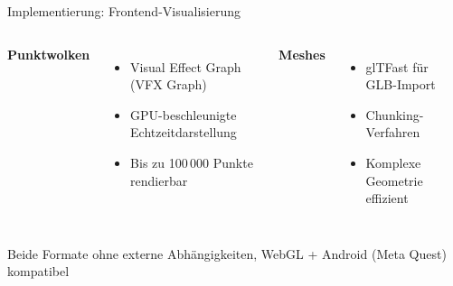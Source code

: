     

\begin{frame}{Implementierung: Frontend-Visualisierung}{\cite{atteneder2024gltfast}}
    \begin{columns}[T]
        \textbf{Punktwolken}
        \begin{itemize}
            \itemsep0.4em
            \item Visual Effect Graph (VFX Graph)
            \item GPU-beschleunigte Echtzeitdarstellung
            \item Bis zu 100\,000 Punkte rendierbar
        \end{itemize}
        
        \textbf{Meshes}
        \begin{itemize}
            \itemsep0.4em
            \item glTFast für GLB-Import
            \item Chunking-Verfahren
            \item Komplexe Geometrie effizient
        \end{itemize}
    \end{columns}
    
    \vfill
    \begin{tcolorbox}[box5, boxsep=0.5em]
        \centering
        Beide Formate ohne externe Abhängigkeiten, WebGL + Android (Meta Quest) kompatibel
    \end{tcolorbox}
\end{frame}

